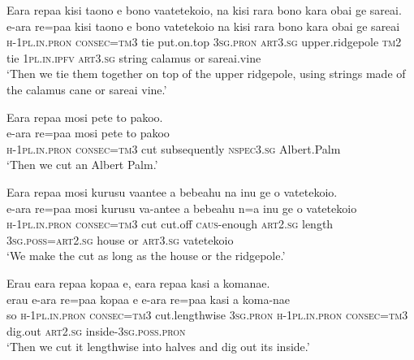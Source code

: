 \newpage
\ea\label{ex:text13-5}
Eara repaa kisi taono e bono vaatetekoio, na kisi rara bono kara obai ge sareai.\\
\gll e-ara	re=paa	kisi	taono	e	bono	vatetekoio	na	kisi	rara	bono	kara	obai	ge	sareai\\
     \textsc{h}-1\textsc{pl}.\textsc{in}.\textsc{pron}	\textsc{consec}=\textsc{tm}3	tie	put.on.top	3\textsc{sg}.\textsc{pron}	\textsc{art}3.\textsc{sg}	upper.ridgepole	\textsc{tm}2	tie	1\textsc{pl}.\textsc{in}.\textsc{ipfv}	\textsc{art}3.\textsc{sg}	string	calamus	or	sareai.vine\\
\glt `Then we tie them together on top of the upper ridgepole, using strings made of the calamus cane or sareai vine.'
\z

\ea\label{ex:text13-6}
Eara repaa mosi pete to pakoo.\\
\gll e-ara	re=paa	mosi	pete	to	pakoo\\
     \textsc{h}-1\textsc{pl}.\textsc{in}.\textsc{pron}	\textsc{consec}=\textsc{tm}3	cut	subsequently	\textsc{nspec}3.\textsc{sg}	Albert.Palm\\
\glt `Then we cut an Albert Palm.'
\z

\ea\label{ex:text13-7}
Eara repaa mosi kurusu vaantee a bebeahu na inu ge o vatetekoio.\\
\gll e-ara	re=paa	mosi	kurusu	va-antee	a	bebeahu	n=a	inu	ge	o	vatetekoio\\
     \textsc{h}-1\textsc{pl}.\textsc{in}.\textsc{pron}	\textsc{consec}=\textsc{tm}3	cut	cut.off	\textsc{caus}-enough	\textsc{art}2.\textsc{sg}	length	3\textsc{sg}.\textsc{poss}=\textsc{art}2.\textsc{sg}	house	or	\textsc{art}3.\textsc{sg}	vatetekoio\\
\glt `We make the cut as long as the house or the ridgepole.'
\z

\ea\label{ex:text13-8}
Erau eara repaa kopaa e, eara repaa kasi a komanae.\\
\gll erau	e-ara	re=paa	kopaa	e	e-ara	re=paa	kasi	a	koma-nae\\
     so	\textsc{h}-1\textsc{pl}.\textsc{in}.\textsc{pron}	\textsc{consec}=\textsc{tm}3	cut.lengthwise	3\textsc{sg}.\textsc{pron}	\textsc{h}-1\textsc{pl}.\textsc{in}.\textsc{pron}	\textsc{consec}=\textsc{tm}3	dig.out	\textsc{art}2.\textsc{sg}	inside-3\textsc{sg}.\textsc{poss}.\textsc{pron}\\
\glt `Then we cut it lengthwise into halves and dig out its inside.'
\z

